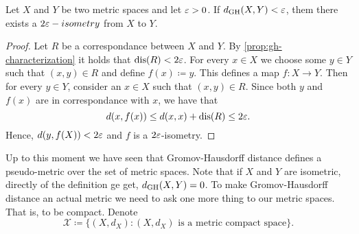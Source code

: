 \begin{proposition} \label{prop:e-isometry}
    Let $ X $ and $ Y $ be two metric spaces and let $ \varepsilon > 0 $. If $ d_{\operatorname{GH}}(X, Y) < \varepsilon $, them there exists a $ 2\varepsilon-isometry $ from $ X $ to $ Y $.
\end{proposition}
\begin{proof}
    Let $ R $ be a correspondance between $ X $ and $ Y $. By \ref{prop:gh-characterization} it holds that $\operatorname{dis}(R) < 2 \varepsilon$. For every $ x \in X $ we choose some $ y \in Y $ such that $(x, y) \in R$ and define $ f(x) \coloneq y $. This defines a map $ f \colon X \to Y $. Then for every $ y \in Y $, consider an $ x \in X $ such that $ (x,y) \in R $. Since both $ y $ and $ f(x) $ are in correspondance with $ x $, we have that
    \begin{equation}
        d(x, f(x)) \leq d(x, x) + \operatorname{dis}(R) \leq 2\varepsilon.
    \end{equation}
    Hence, $ d(y, f(X)) < 2 \varepsilon $ and $ f $ is a $ 2\varepsilon $-isometry.
\end{proof}

Up to this moment we have seen that Gromov-Hausdorff distance defines a pseudo-metric over the set of metric spaces. Note that if $ X $ and $ Y $ are isometric, directly of the definition ge get, $ d_{\operatorname{GH}}(X, Y) = 0 $. To make Gromov-Hausdorff distance an actual metric we need to ask one more thing to our metric spaces. That is, to be compact. Denote
\begin{equation}
    \mathcal{X} \coloneq \{ (X, d_X) \colon (X, d_X) \text{ is a metric compact space} \}.
\end{equation}

